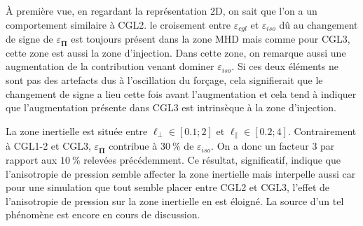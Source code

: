 À première vue, en regardant la représentation \acs{2D}, on sait que l'on a un comportement similaire à CGL2. le croisement entre $\varepsilon_{cgl}$ et $\varepsilon_{iso}$ dû au changement de signe de $\varepsilon_{\overline{\boldsymbol{\Pi}}}$ est toujours présent dans la zone \ac{MHD} mais comme pour CGL3, cette zone est aussi la zone d'injection. Dans cette zone, on remarque aussi une augmentation de la contribution venant dominer $\varepsilon_{iso}$. Si ces deux éléments ne sont pas des artefacts dus à l'oscillation du forçage, cela signifierait que le changement de signe a lieu cette fois avant l'augmentation et cela tend à indiquer que l'augmentation présente dans CGL3 est intrinsèque à la zone d'injection.

La zone inertielle est située entre $\ell_{\perp} \in [\num{0.1};\num{2}]$ et $\ell_{\parallel} \in [\num{0.2};\num{4}]$.  Contrairement à CGL1-2 et CGL3, $\varepsilon_{\overline{\boldsymbol{\Pi}}}$ contribue à $\SI{30}{\%}$ de $\varepsilon_{iso}$. On a donc un facteur 3 par rapport aux $\SI{10}{\%}$ relevées précédemment. Ce résultat, significatif, indique que l'anisotropie de pression semble affecter la zone inertielle mais interpelle aussi car pour une simulation que tout semble placer entre CGL2 et CGL3, l'effet de l'anisotropie de pression sur la zone inertielle en est éloigné. La source d'un tel phénomène est encore en cours de discussion. 
 

